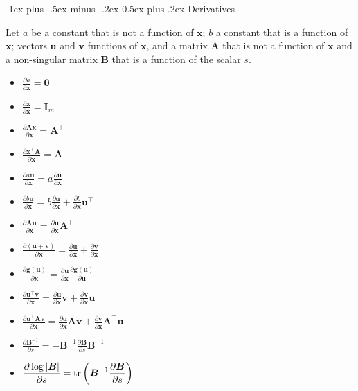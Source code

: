 \documentclass[12pt,landscape, a4paper]{article}
\makeatletter
\newcommand{\bs}[1]{\ensuremath{\boldsymbol{#1}}}
\newcommand{\tp}{{\!\scriptscriptstyle \top}}
\renewcommand{\section}{\@startsection{section}{1}{0mm}%
                                {-1ex plus -.5ex minus -.2ex}%
                                {0.5ex plus .2ex}%
                                {\normalfont\large\bfseries}}
\newcommand{\tr}[1]{{\rm tr}\left(#1\right)}
\makeatother
\begin{document}
\begin{multicols}{3}
\section{Derivatives}

Let $a$ be a constant that is not a function of $\bs{x}$; $b$ a constant that is a function of $\bs{x}$; vectors $\bs{u}$ and $\bs{v}$ functions of $\bs{x}$, and a matrix \bs{A} that is not a function of $\bs{x}$ and a non-singular matrix $\bs{B}$ that is a function of the scalar $s$.    
\begin{multicols}{2}
	\begin{itemize}
		\item $\displaystyle \frac{\partial a}{\partial \bs{x}} = \bs{0}$
		\item $\displaystyle \frac{\partial \bs{x}}{\partial \bs{x}} = \bs{I}_m$
		\item $\displaystyle \frac{\partial \bs{Ax}}{\partial \bs{x}} = \bs{A}^\tp$
		\item $\displaystyle \frac{\partial \bs{x}^\tp\bs{A}}{\partial \bs{x}} = \bs{A}$
		\item $\displaystyle \frac{\partial a\bs{u}}{\partial \bs{x}} = a\frac{\partial \bs{u}}{\partial \bs{x}}$
		\item $\displaystyle \frac{\partial b\bs{u}}{\partial \bs{x}} = b\frac{\partial \bs{u}}{\partial \bs{x}} + \frac{\partial b}{\partial \bs{x}}\bs{u}^\tp$
		\item $\displaystyle \frac{\partial \bs{Au}}{\partial \bs{x}} = \frac{\partial \bs{u}}{\partial \bs{x}}\bs{A}^\tp$
		\item $\displaystyle \frac{\partial (\bs{u} + \bs{v})}{\partial \bs{x}} = \frac{\partial \bs{u}}{\partial \bs{x}} + \frac{\partial \bs{v}}{\partial \bs{x}}$
		\item $\displaystyle \frac{\partial \bs{g}(\bs{u})}{\partial \bs{x}} = \frac{\partial \bs{u}}{\partial \bs{x}}\frac{\partial \bs{g}(\bs{u})}{\partial \bs{u}} $
		\item $\displaystyle \frac{\partial \bs{u}^\tp\bs{v}}{\partial \bs{x}} = \frac{\partial \bs{u}}{\partial \bs{x}}\bs{v} + \frac{\partial \bs{v}}{\partial \bs{x}}\bs{u} $
		\item $\displaystyle \frac{\partial \bs{u}^\tp\bs{Av}}{\partial \bs{x}} = \frac{\partial \bs{u}}{\partial \bs{x}}\bs{Av} + \frac{\partial \bs{v}}{\partial \bs{x}}\bs{A}^\tp\bs{u} $
		\item $\displaystyle \frac{\partial \bs{B}^{-1}}{\partial s} = -\bs{B}^{-1} \frac{\partial \bs{B}}{\partial s} \bs{B}^{-1}$
		\item $\displaystyle \frac{\partial \log|\bs{B}|}{\partial s} = \tr{\bs{B}^{-1}\frac{\partial \bs{B}}{\partial s}}$
	\end{itemize}
\end{multicols}


\end{multicols}
\end{document}
